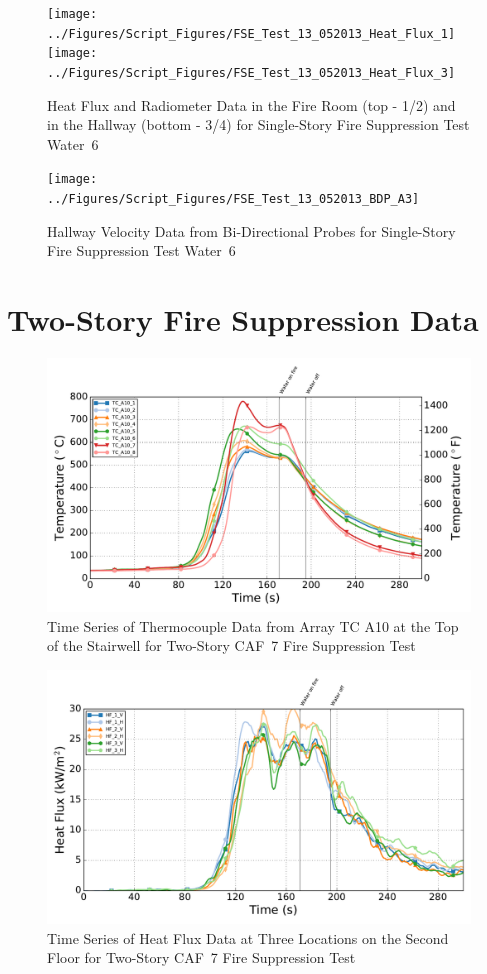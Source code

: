 \documentclass[12pt,oneside]{book}
\begin{document}
\begin{figure}[ht]
\texttt{[image: ../Figures/Script\_Figures/FSE\_Test\_13\_052013\_Heat\_Flux\_1]}
\texttt{[image: ../Figures/Script\_Figures/FSE\_Test\_13\_052013\_Heat\_Flux\_3]}
\caption{Heat Flux and Radiometer Data in the Fire Room (top - 1/2) and in the Hallway (bottom - 3/4) for Single-Story Fire Suppression Test Water~6}
\end{figure}

\clearpage

\begin{figure}[ht]
\texttt{[image: ../Figures/Script\_Figures/FSE\_Test\_13\_052013\_BDP\_A3]}
\caption{Hallway Velocity Data from Bi-Directional Probes for Single-Story Fire Suppression Test Water~6}
\end{figure}
\newpage

\chapter{Two-Story Fire Suppression Data}
\label{app:fire_suppression2}

\begin{figure}[!ht]
	\includegraphics[width=.85\columnwidth]{../Figures/Script_Figures/Test_38_West_061315_TC_A10}
	\caption{Time Series of Thermocouple Data from Array TC A10 at the Top of the Stairwell for Two-Story CAF~7 Fire Suppression Test}
	\label{fig:app_caf7_tca10}
\end{figure}
\clearpage

\begin{figure}[!ht]
	\includegraphics[width=.85\columnwidth]{../Figures/Script_Figures/Test_38_West_061315_Heat_Flux}
	\caption{Time Series of Heat Flux Data at Three Locations on the Second Floor for Two-Story CAF~7 Fire Suppression Test}
	\label{fig:app_caf7_hf}
\end{figure}
\end{document}
